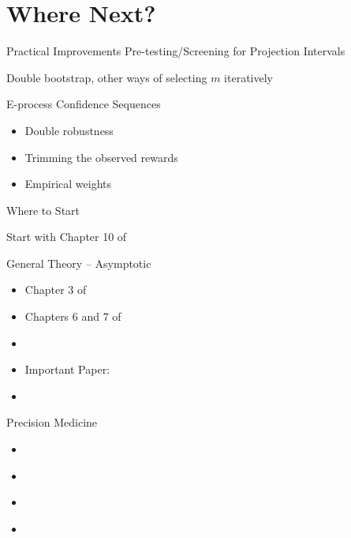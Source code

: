 \documentclass[aspectratio=169, professionalfonts, handout]{beamer}
\begin{document}

\section{Where Next?}

\begin{frame}{Practical Improvements}
	Pre-testing/Screening for Projection Intervals
	\vfill

	Double bootstrap, other ways of selecting $m$ iteratively

	\vfill

	E-process Confidence Sequences
	\begin{itemize}
		\item Double robustness
		\item Trimming the observed rewards
		\item Empirical weights
	\end{itemize}
\end{frame}


\begin{frame}{Where to Start}
	\vfill

	Start with Chapter 10 of \cite{tsiatis2019Dynamic}
	\vfill

\end{frame}

\begin{frame}{General Theory -- Asymptotic}
	\vfill
	\begin{itemize}
		\item Chapter 3 of \cite{tsiatis2006Semiparametric}
		      \vfill
		\item Chapters 6 and 7 of \cite{vandervaart2000Asymptotic}
		      \vfill
		\item \cite{kosorok2008Introduction}
		      \vfill
		\item Important Paper: \cite{hirano2012Impossibility}
		      \vfill


		\item 	\cite{bibaut2021PostContextualBandit}
		      \vfill
	\end{itemize}
\end{frame}

\begin{frame}{Precision Medicine}
	\vfill
	\begin{itemize}
		\item \cite{laber2014Dynamic}
		      \vfill

		\item 	\cite{luedtke2016Statistical}
		      \vfill

		\item 	\cite{shi2022Statistical}

		\item \cite{hadad2021Confidence}
	\end{itemize}
	\vfill

\end{frame}
\end{document}
